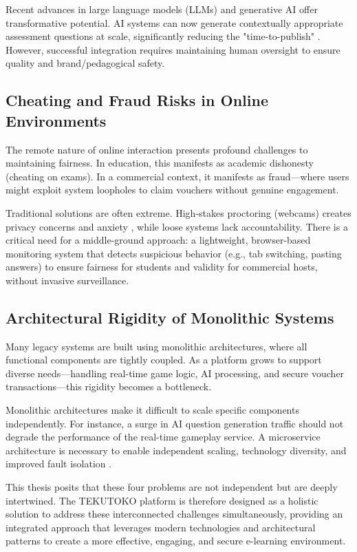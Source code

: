Recent advances in large language models (LLMs) and generative AI offer transformative potential. AI systems can now generate contextually appropriate assessment questions at scale, significantly reducing the "time-to-publish" \citep{kasneci2023}. However, successful integration requires maintaining human oversight to ensure quality and brand/pedagogical safety.

\subsection{Cheating and Fraud Risks in Online Environments}
The remote nature of online interaction presents profound challenges to maintaining fairness. In education, this manifests as academic dishonesty (cheating on exams). In a commercial context, it manifests as fraud—where users might exploit system loopholes to claim vouchers without genuine engagement.

Traditional solutions are often extreme. High-stakes proctoring (webcams) creates privacy concerns and anxiety \citep{balderas2021}, while loose systems lack accountability. There is a critical need for a middle-ground approach: a lightweight, browser-based monitoring system that detects suspicious behavior (e.g., tab switching, pasting answers) to ensure fairness for students and validity for commercial hosts, without invasive surveillance.

\subsection{Architectural Rigidity of Monolithic Systems}
Many legacy systems are built using monolithic architectures, where all functional components are tightly coupled. As a platform grows to support diverse needs—handling real-time game logic, AI processing, and secure voucher transactions—this rigidity becomes a bottleneck.

Monolithic architectures make it difficult to scale specific components independently. For instance, a surge in AI question generation traffic should not degrade the performance of the real-time gameplay service. A microservice architecture is necessary to enable independent scaling, technology diversity, and improved fault isolation \citep{richards2020}.

This thesis posits that these four problems are not independent but are deeply intertwined. The TEKUTOKO platform is therefore designed as a holistic solution to address these interconnected challenges simultaneously, providing an integrated approach that leverages modern technologies and architectural patterns to create a more effective, engaging, and secure e-learning environment.


